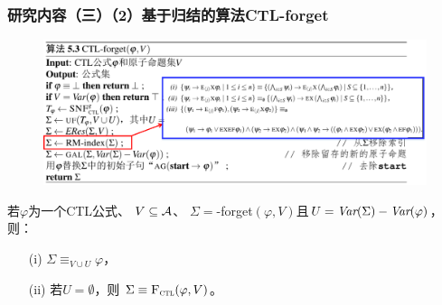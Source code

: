 \documentclass[aspectratio=1610, 9pt, CJK]{beamer}
\begin{document}
\begin{frame}
	\frametitle{研究内容（三）（2）基于归结的算法CTL-forget}
		
		
		
		\begin{figure}
			\includegraphics[scale=0.45]{figures/CTL-forget3}
		\end{figure}
		\begin{theorem}[可靠性] 
			若$\varphi$为一个CTL公式、 $V\subseteq\cal A$、 $\Sigma=$\CTL-forget$(\varphi,V)$且$U=\textit{Var}(\Sigma)-\textit{Var}(\varphi)$，则：
			\begin{itemize}
				\item[(i)] $\Sigma\equiv_{V\cup U}\varphi$，
				\item[(ii)] 若$U=\emptyset$，则 $\Sigma\equiv{\textsc{F}_{\textsc{ctl}}}(\varphi,V)$。
			\end{itemize}
		\end{theorem}
		
\end{frame}
\end{document}
